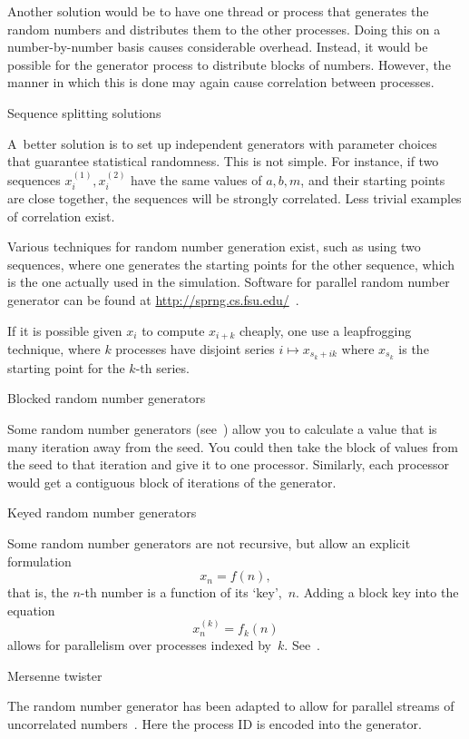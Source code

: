Another solution would be to have one thread or process that generates
the random numbers and distributes them to the other processes.
Doing this on a number-by-number basis causes considerable overhead.
Instead, it would be possible for the generator process to distribute
blocks of numbers. However, the manner in which this is done may again
cause correlation between processes.

 {Sequence splitting solutions}

A~better solution is to set up independent generators with
parameter choices that guarantee statistical randomness. This is not
simple. For instance, if two sequences $x^{(1)}_i,x^{(2)}_i$ have the
same values of $a,b,m$, and their starting points are close together,
the sequences will be strongly correlated. Less trivial examples of
correlation exist.

Various techniques for random number generation exist, such as using
two sequences, where one generates the starting points for the other
sequence, which is the one actually used in the simulation. Software
for parallel random number generator can be found at
\url{http://sprng.cs.fsu.edu/}~\cite{Mascagni:SPRNG}.

If it is possible given $x_i$ to compute $x_{i+k}$ cheaply, one use a
leapfrogging technique, where $k$ processes have disjoint series
$i\mapsto x_{s_k+ik}$ where $x_{s_k}$ is the starting point for the
$k$-th series.

 {Blocked random number generators}

Some random number generators (see~\cite{LEcuyer:multiple-random})
allow you to calculate a value that is many iteration away from the seed.
You could then take the block of values from the seed to that iteration
and give it to one processor. Similarly, each processor would get a contiguous
block of iterations of the generator.

 {Keyed random number generators}

Some random number generators are not recursive, but allow
an explicit formulation \[ x_n = f(n), \]
that is, the $n$-th number is a function of its `key',~$n$.
Adding a block key into the equation
\[ x_n^{(k)} = f_k(n) \]
allows for parallelism over processes indexed by~$k$.
See~\cite{Salmon:prng123}.

 {Mersenne twister}

The  random number generator has been
adapted to allow for parallel streams of uncorrelated
numbers~\cite{Matsumoto:DynamicMersenne}. Here the process ID is
encoded into the generator.




